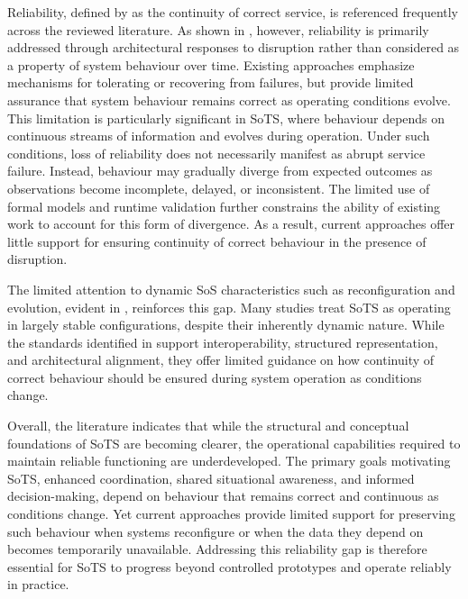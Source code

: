 Reliability, defined by \citet{avizienis2004basic} as the continuity of correct service, is referenced frequently across the reviewed literature. As shown in , however, reliability is primarily addressed through architectural responses to disruption rather than considered as a property of system behaviour over time. Existing approaches emphasize mechanisms for tolerating or recovering from failures, but provide limited assurance that system behaviour remains correct as operating conditions evolve.
This limitation is particularly significant in SoTS, where behaviour depends on continuous streams of information and evolves during operation. Under such conditions, loss of reliability does not necessarily manifest as abrupt service failure. Instead, behaviour may gradually diverge from expected outcomes as observations become incomplete, delayed, or inconsistent. The limited use of formal models and runtime validation further constrains the ability of existing work to account for this form of divergence. As a result, current approaches offer little support for ensuring continuity of correct behaviour in the presence of disruption.

The limited attention to dynamic SoS characteristics such as reconfiguration and evolution, evident in , reinforces this gap. Many studies treat SoTS as operating in largely stable configurations, despite their inherently dynamic nature. While the standards identified in  support interoperability, structured representation, and architectural alignment, they offer limited guidance on how continuity of correct behaviour should be ensured during system operation as conditions change.


Overall, the literature indicates that while the structural and conceptual foundations of SoTS are becoming clearer, the operational capabilities required to maintain reliable functioning are underdeveloped. The primary goals motivating SoTS, enhanced coordination, shared situational awareness, and informed decision-making, depend on behaviour that remains correct and continuous as conditions change. Yet current approaches provide limited support for preserving such behaviour when systems reconfigure or when the data they depend on becomes temporarily unavailable. Addressing this reliability gap is therefore essential for SoTS to progress beyond controlled prototypes and operate reliably in practice.



